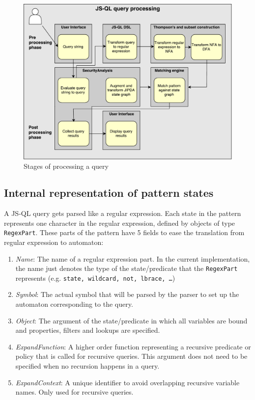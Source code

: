 \begin{figure}[!h]
    \centering
      \includegraphics[width=1\textwidth]{images/QueryProcessing} 
      \caption{Stages of processing a query}
    \label{fig:QueryProcessing}
\end{figure}

\subsection*{Internal representation of pattern states}

A JS-QL query gets parsed like a regular expression. Each state in the pattern represents one character in the regular expression, defined by objects of type \texttt{RegexPart}. These parts of the pattern have 5 fields to ease the translation from regular expression to automaton:
\begin{enumerate}
\item \textit{Name}: The name of a regular expression part. In the current implementation, the name just denotes the type of the state/predicate that the \texttt{RegexPart} represents (e.g. \texttt{state, wildcard, not, lbrace, \ldots})
\item \textit{Symbol}: The actual symbol that will be parsed by the parser to set up the automaton corresponding to the query.
\item \textit{Object}: The argument of the state/predicate in which all variables are bound and properties, filters and lookups are specified.
\item \textit{ExpandFunction}: A higher order function representing a recursive predicate or policy that is called for recursive queries. This argument does not need to be specified when no recursion happens in a query.
\item \textit{ExpandContext}: A unique identifier to avoid overlapping recursive variable names. Only used for recursive queries.
\end{enumerate}

